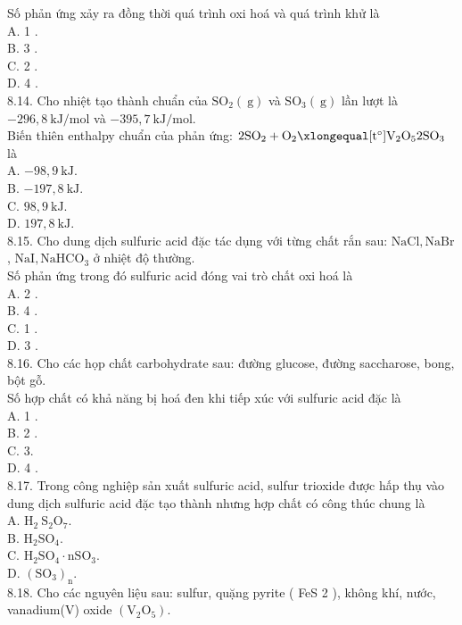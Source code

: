 \documentclass[10pt]{article}
\begin{document}
Số phản ứng xảy ra đồng thời quá trình oxi hoá và quá trình khử là\\
A. 1 .\\
B. 3 .\\
C. 2 .\\
D. 4 .\\
8.14. Cho nhiệt tạo thành chuẩn của $\mathrm{SO}_{2}(\mathrm{~g})$ và $\mathrm{SO}_{3}(\mathrm{~g})$ lần lượt là $-296,8 \mathrm{~kJ} / \mathrm{mol}$ và $-395,7 \mathrm{~kJ} / \mathrm{mol}$.\\
Biến thiên enthalpy chuẩn của phản ứng: $2 \mathrm{SO}_{2}+\mathrm{O}_{2} \xlongequal[\mathrm{t}^{\circ}]{\mathrm{V}_{2} \mathrm{O}_{5}} 2 \mathrm{SO}_{3}$ là\\
A. $-98,9 \mathrm{~kJ}$.\\
B. $-197,8 \mathrm{~kJ}$.\\
C. $98,9 \mathrm{~kJ}$.\\
D. $197,8 \mathrm{~kJ}$.\\
8.15. Cho dung dịch sulfuric acid đặc tác dụng với từng chất rắn sau: $\mathrm{NaCl}, \mathrm{NaBr}$, $\mathrm{NaI}, \mathrm{NaHCO}_{3}$ ở nhiệt độ thường.\\
Số phản ứng trong đó sulfuric acid đóng vai trò chất oxi hoá là\\
A. 2 .\\
B. 4 .\\
C. 1 .\\
D. 3 .\\
8.16. Cho các họp chất carbohydrate sau: đường glucose, đường saccharose, bong, bột gỗ.\\
Số hợp chất có khả năng bị hoá đen khi tiếp xúc với sulfuric acid đặc là\\
A. 1 .\\
B. 2 .\\
C. 3.\\
D. 4 .\\
8.17. Trong công nghiệp sản xuất sulfuric acid, sulfur trioxide được hấp thụ vào dung dịch sulfuric acid đặc tạo thành nhưng hợp chất có công thúc chung là\\
A. $\mathrm{H}_{2} \mathrm{~S}_{2} \mathrm{O}_{7}$.\\
B. $\mathrm{H}_{2} \mathrm{SO}_{4}$.\\
C. $\mathrm{H}_{2} \mathrm{SO}_{4} \cdot \mathrm{nSO}_{3}$.\\
D. $\left(\mathrm{SO}_{3}\right)_{\mathrm{n}}$.\\
8.18. Cho các nguyên liệu sau: sulfur, quặng pyrite ( FeS 2 ), không khí, nước, vanadium(V) oxide $\left(\mathrm{V}_{2} \mathrm{O}_{5}\right)$.\\
\end{document}
